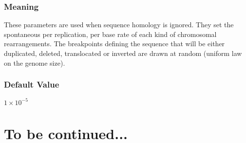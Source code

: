 \subsubsection{Meaning}
These parameters are used when sequence homology is ignored. They set the spontaneous per replication, per base rate of each kind of chromosomal rearrangements. The breakpoints defining the sequence that will be either duplicated, deleted, translocated or inverted are drawn at random (uniform law on the genome size).
\subsubsection{Default Value}
$1\times{}10^{-5}$


\section{To be continued...}



\clearemptydoublepage